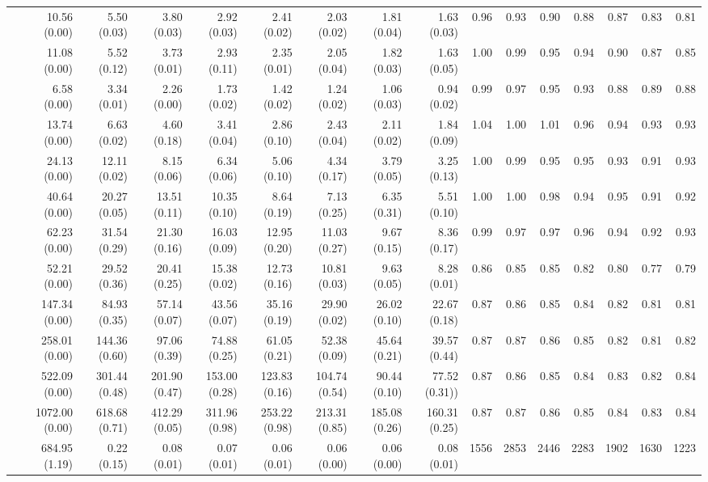 \documentclass[preprint]{tlp}
\begin{document}
\begin{landscape}
\begin{tabular}{@{\extracolsep{\fill}}|c|r|r|r|r|r|r|r|r||r|r|r|r|r|r|r|}
 & 10.56 (0.00) & 5.50 (0.03) & 3.80 (0.03) & 2.92 (0.03) & 2.41 (0.02) & 2.03 (0.02) & 1.81 (0.04) & 1.63 (0.03)& 0.96 & 0.93 & 0.90 & 0.88 & 0.87 & 0.83 & 0.81 \\
 & 11.08 (0.00) & 5.52 (0.12) & 3.73 (0.01) & 2.93 (0.11) & 2.35 (0.01) & 2.05 (0.04) & 1.82 (0.03) & 1.63 (0.05)& 1.00 & 0.99 & 0.95 & 0.94 & 0.90 & 0.87 & 0.85 \\
\cline{1-16}
 & 6.58 (0.00) & 3.34 (0.01) & 2.26 (0.00) & 1.73 (0.02) & 1.42 (0.02) & 1.24 (0.02) & 1.06 (0.03) & 0.94 (0.02)& 0.99 & 0.97 & 0.95 & 0.93 & 0.88 & 0.89 & 0.88 \\
 & 13.74 (0.00) & 6.63 (0.02) & 4.60 (0.18) & 3.41 (0.04) & 2.86 (0.10) & 2.43 (0.04) & 2.11 (0.02) & 1.84 (0.09)& 1.04 & 1.00 & 1.01 & 0.96 & 0.94 & 0.93 & 0.93\\
 & 24.13 (0.00) & 12.11 (0.02) & 8.15 (0.06) & 6.34 (0.06) & 5.06 (0.10) & 4.34 (0.17) & 3.79 (0.05) & 3.25 (0.13)& 1.00 & 0.99 & 0.95 & 0.95 & 0.93 & 0.91 & 0.93\\
 & 40.64 (0.00) & 20.27 (0.05) & 13.51 (0.11) & 10.35 (0.10) & 8.64 (0.19) & 7.13 (0.25) & 6.35 (0.31) & 5.51 (0.10)& 1.00 & 1.00 & 0.98 & 0.94 & 0.95 & 0.91 & 0.92 \\
 & 62.23 (0.00) & 31.54 (0.29) & 21.30 (0.16) & 16.03 (0.09) & 12.95 (0.20) & 11.03 (0.27) & 9.67 (0.15) & 8.36 (0.17)& 0.99 & 0.97 & 0.97 & 0.96 & 0.94 & 0.92 & 0.93 \\
\cline{1-16}
 & 52.21 (0.00) & 29.52 (0.36) & 20.41 (0.25) & 15.38 (0.02) & 12.73 (0.16) & 10.81 (0.03) & 9.63 (0.05) & 8.28 (0.01)& 0.86 & 0.85 & 0.85 & 0.82 & 0.80 & 0.77 & 0.79 \\
 & 147.34 (0.00) & 84.93 (0.35) & 57.14 (0.07) & 43.56 (0.07) & 35.16 (0.19) & 29.90 (0.02) & 26.02 (0.10) & 22.67 (0.18)& 0.87 & 0.86 & 0.85 & 0.84 & 0.82 & 0.81 & 0.81 \\
 & 258.01 (0.00) & 144.36 (0.60) & 97.06 (0.39) & 74.88 (0.25) & 61.05 (0.21) & 52.38 (0.09) & 45.64 (0.21) & 39.57 (0.44)& 0.87 & 0.87 & 0.86 & 0.85 & 0.82 & 0.81 & 0.82 \\
 & 522.09 (0.00) & 301.44 (0.48) & 201.90 (0.47) & 153.00 (0.28) & 123.83 (0.16) & 104.74 (0.54) & 90.44 (0.10) & 77.52 (0.31))& 0.87 & 0.86 & 0.85 & 0.84 & 0.83 & 0.82 & 0.84 \\
 & 1072.00 (0.00) & 618.68 (0.71) & 412.29 (0.05) & 311.96 (0.98) & 253.22 (0.98) & 213.31 (0.85) & 185.08 (0.26) & 160.31 (0.25)& 0.87 & 0.87 & 0.86 & 0.85 & 0.84 & 0.83 & 0.84 \\
\cline{1-16}
& 684.95 (1.19)  & 0.22 (0.15) &  0.08 (0.01) & 0.07 (0.01) & 0.06 (0.01) &  0.06 (0.00) & 0.06 (0.00) & 0.08 (0.01) & 1556 & 2853 & 2446 & 2283 & 1902 & 1630 & 1223 \\
 \cline{1-16}
\end{tabular}
  \label{table2}
\end{landscape}
\end{document}
